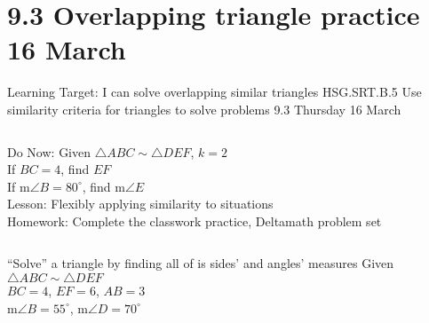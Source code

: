 \documentclass[onlytextwidth, aspectratio=169]{beamer}
\begin{document}
\section{9.3 Overlapping triangle practice \hfill 16 March \,}
\begin{frame}{Learning Target: I can solve overlapping similar triangles}
  {HSG.SRT.B.5 Use similarity criteria for triangles to solve problems \hfill \alert{9.3 Thursday 16 March}}
  \begin{columns}
    Do Now: Given $\triangle ABC \sim \triangle DEF$, $k=2$ \\
    If $BC=4$, find $EF$ \\
    If m$\angle B = 80^\circ$, find m$\angle E$\\[0.5cm]
    Lesson: Flexibly applying similarity to situations \\[0.5cm]
    Homework: Complete the classwork practice, Deltamath problem set \\[0.5cm]
    \begin{flushright}
    \end{flushright}
  \end{columns}
\end{frame}

\begin{frame}{``Solve'' a triangle by finding all of is sides' and angles' measures}
    Given $\triangle ABC \sim \triangle DEF$ \\[0.2cm]
    $BC=4$, $EF=6$, $AB=3$\\[0.2cm]
    m$\angle B = 55^\circ$, m$\angle D=70^\circ$\\[0.5cm]
    \begin{center}
    \end{center}
\end{frame}
\end{document}
